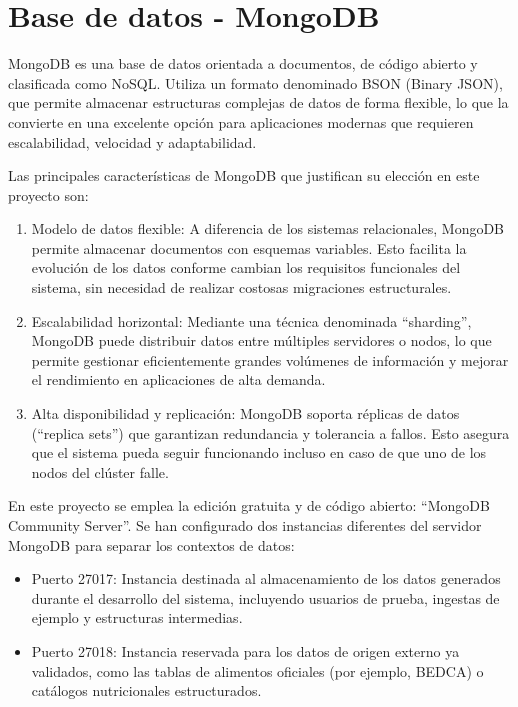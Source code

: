 \section{Base de datos - MongoDB\cite{mongodbDocs}}
MongoDB es una base de datos orientada a documentos, de código abierto y clasificada como NoSQL. Utiliza un formato denominado BSON (Binary JSON), que permite almacenar estructuras complejas de datos de forma flexible, lo que la convierte en una excelente opción para aplicaciones modernas que requieren escalabilidad, velocidad y adaptabilidad.

Las principales características de MongoDB que justifican su elección en este proyecto son:

\begin{enumerate}
    \item Modelo de datos flexible: A diferencia de los sistemas relacionales, MongoDB permite almacenar documentos con esquemas variables. Esto facilita la evolución de los datos conforme cambian los requisitos funcionales del sistema, sin necesidad de realizar costosas migraciones estructurales.
    
    \item Escalabilidad horizontal: Mediante una técnica denominada ``sharding'', MongoDB puede distribuir datos entre múltiples servidores o nodos, lo que permite gestionar eficientemente grandes volúmenes de información y mejorar el rendimiento en aplicaciones de alta demanda.
    
    \item Alta disponibilidad y replicación: MongoDB soporta réplicas de datos (``replica sets'') que garantizan redundancia y tolerancia a fallos. Esto asegura que el sistema pueda seguir funcionando incluso en caso de que uno de los nodos del clúster falle.
\end{enumerate}

En este proyecto se emplea la edición gratuita y de código abierto: ``MongoDB Community Server''. Se han configurado dos instancias diferentes del servidor MongoDB para separar los contextos de datos:

\begin{itemize}
    \item Puerto 27017: Instancia destinada al almacenamiento de los datos generados durante el desarrollo del sistema, incluyendo usuarios de prueba, ingestas de ejemplo y estructuras intermedias.
    \item Puerto 27018: Instancia reservada para los datos de origen externo ya validados, como las tablas de alimentos oficiales (por ejemplo, BEDCA) o catálogos nutricionales estructurados.
\end{itemize}

